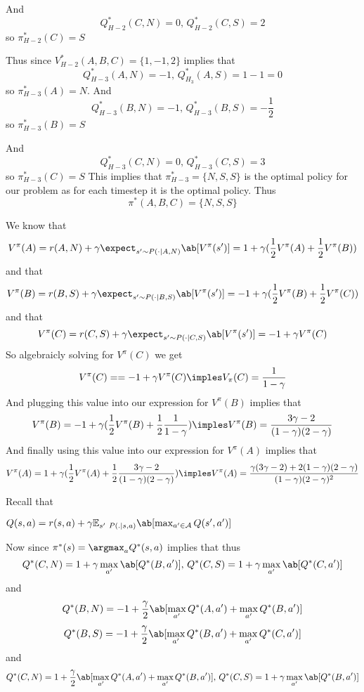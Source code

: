\documentclass[12pt]{amsart}
\begin{document}
\begin{problem}
\begin{subproblem}
      And \[Q_{H-2}^*(C,N) = 0,\, Q_{H-2}^*(C,S)= 2\] so $\pi_{H-2}^*(C)=S$ 

      Thus since $V_{H-2}^*(A,B,C)= \{1,-1,2\}$ implies that 
      \[Q_{H-3}^*(A,N) =-1,\, Q_{H_3}^*(A,S) = 1-1=0\] so $\pi_{H-3}^*(A)=N$. 
      And 
      \[Q_{H-3}^*(B,N)= -1,\, Q_{H-3}^*(B,S) = -\frac12\] so $\pi_{H-3}^*(B) = S$

      And \[Q_{H-3}^*(C,N) = 0,\, Q_{H-3}^*(C,S)= 3\] so $\pi_{H-3}^*(C)=S$ 
      This implies that $\pi^*_{H-3} =\{N,S,S\}$ is the optimal policy for our problem as for each timestep it is the optimal policy. Thus 
      \[\pi^*(A,B,C)=\{N,S,S\}\] 
    \end{subproblem}
    \begin{subproblem}
      We know that 
      \[V^\pi(A)=r(A,N)+\gamma\expect_{s'\sim P(\cdot |A,N)}\ab[V^\pi(s')] = 1+\gamma(\frac12V^\pi(A)+\frac12V^\pi(B))\]      
      and that 
      \[V^\pi(B)=r(B,S)+\gamma\expect_{s'\sim P(\cdot |B,S)}\ab[V^\pi(s')] =-1+\gamma(\frac12V^\pi(B)+\frac12V^\pi(C))\]
      and that 
      \[V^\pi(C)=r(C,S)+\gamma\expect_{s'\sim P(\cdot |C,S)}\ab[V^\pi(s')] =-1+\gamma V^\pi(C)\]
      So algebraicly solving for $V^\pi(C)$ we get
      \[V^\pi(C)==-1+\gamma V^\pi(C)\imples V_\pi(C)=\frac1{1-\gamma}\]
      And plugging this value into our expression for $V^\pi(B)$ implies that 
      \[V^\pi(B)=-1+\gamma(\frac12V^\pi(B)+\frac12\frac1{1-\gamma})\imples V^\pi(B) = \frac{3\gamma-2}{(1-\gamma)(2-\gamma)}\]
      And finally using this value into our expression for $V^\pi(A)$ implies that 
      \[V^\pi(A)= 1+\gamma(\frac12V^\pi(A)+\frac12\frac{3\gamma-2}{(1-\gamma)(2-\gamma)})\imples V^\pi(A) = \frac{\gamma(3\gamma-2) + 2(1-\gamma)(2-\gamma)}{(1-\gamma)(2-\gamma)^2}\]      

    \end{subproblem} 
    \begin{subproblem}
      Recall that 
      \begin{definition}
        $Q(s,a) = r(s,a) + \gamma \mathbb{E}_{s'~P(.|s,a)}\ab[\max_{a'\in \mathcal{A}}Q(s',a')]$
      \end{definition}
      Now since $\pi^*(s)=\argmax_a Q^*(s,a)$ implies that thus 
      \[Q^*(C,N) = 1+\gamma \max_{a'}\ab[Q^*(B,a')],\,Q^*(C,S) = 1+\gamma \max_{a'}\ab[Q^*(C,a')]\]
      and 
      \[Q^*(B,N) = -1+\frac\gamma2\ab[\max_{a'}Q^*(A,a')+\max_{a'}Q^*(B,a')]\]
      \[Q^*(B,S) = -1+\frac\gamma2\ab[\max_{a'}Q^*(B,a')+\max_{a'}Q^*(C,a')]\]
      and  
      \[Q^*(C,N) = 1+\frac\gamma2\ab[\max_{a'}Q^*(A,a')+\max_{a'}Q^*(B,a')],\,Q^*(C,S) = 1+\gamma\max_{a'}\ab[Q^*(B,a')]\]

    \end{subproblem}
  \end{problem} 
\end{document}
